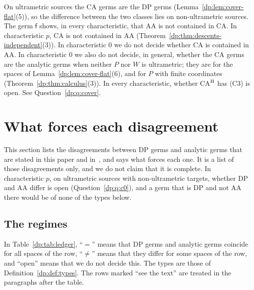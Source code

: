 \documentclass[11pt]{amsart}
\theoremstyle{definition}
\theoremstyle{remark}
\numberwithin{equation}{section}
\theoremstyle{plain}
\theoremstyle{definition}
\theoremstyle{plain}
\begin{document}
On ultrametric sources the CA germs are the DP germs (Lemma~\ref{dp:lem:cover-flat}(5)), so the difference between the two classes lies on non-ultrametric sources. The germ $\mathsf f$ shows, in every characteristic, that AA is not contained in CA. In characteristic $p$, CA is not contained in AA (Theorem~\ref{dp:thm:descents-independent}(3)). In characteristic $0$ we do not decide whether CA is contained in AA. In characteristic $0$ we also do not decide, in general, whether the CA germs are the analytic germs when neither $P$ nor $W$ is ultrametric; they are for the spaces of Lemma~\ref{dp:lem:cover-flat}(6), and for $P$ with finite coordinates (Theorem~\ref{dp:thm:calculus}(3)). In every characteristic, whether CA$^{\rm H}$ has (C3) is open. See Question~\ref{dp:q:cover}.
\section{What forces each disagreement}\label{dp:sec:ledger}

This section lists the disagreements between DP germs and analytic germs that are stated in this paper and in~\cite{I}, and says what forces each one. It is a list of those disagreements only, and we do not claim that it is complete. In characteristic $p$, on ultrametric sources with non-ultrametric targets, whether DP and AA differ is open (Question~\ref{dp:q:c0}), and a germ that is DP and not AA there would be of none of the types below.

\subsection{The regimes}\label{dp:ssec:regimes}

In Table~\ref{dp:tab:ledger}, ``$=$'' means that DP germs and analytic germs coincide for all spaces of the row, ``$\ne$'' means that they differ for some spaces of the row, and ``open'' means that we do not decide this. The types are those of Definition~\ref{dp:def:types}. The rows marked ``see the text'' are treated in the paragraphs after the table.
\end{document}
